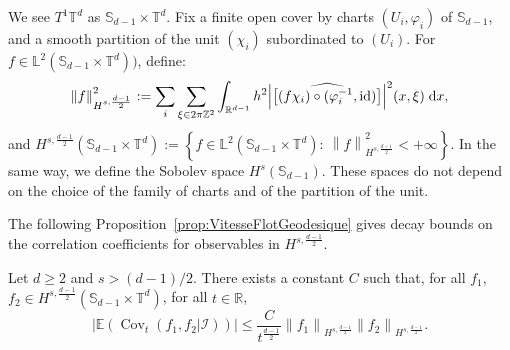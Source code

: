 \documentclass[AHL,Unicode,longabstracts]{cedram}
\DeclareMathOperator{\id}{id}
\DeclareMathOperator{\Cov}{Cov}
\newcommand{\Z}{\mathbb{Z}}
\newcommand{\R}{\mathbb{R}}
\newcommand{\Ebb}{\mathbb{E}}
\newcommand{\Lbb}{\mathbb{L}}
\newcommand{\Sbb}{\mathbb{S}}
\newcommand{\Tbb}{\mathbb{T}}
\newcommand{\Ical}{\mathcal{I}}
\newcommand{\dd}{\;{\rm d}}
\newcommand{\norm}[2]{\left\| #1 \right\|_{#2}}
\renewcommand*{\hat}[1]{\mathchoice{\widehat{#1}}{\widehat{#1}}{\oldhat{#1}}{\oldhat{#1}}}\let\oldforall\forall
\renewcommand*{\forall}{\mathrel{\oldforall}}
\begin{document}
We see $T^1 \Tbb^d$ as $\Sbb_{d-1} \times \Tbb^d$. Fix a finite open cover by charts $(U_i, \varphi_i)$ of $\Sbb_{d-1}$, and a smooth partition of the unit $(\chi_i)$ subordinated to $(U_i)$. For $f\in \Lbb^2 (\Sbb_{d-1} \times \Tbb^d))$, define:
\[
\norm{f}{H^{s,\frac{d-1}{2}}}^2 := \sum_i \sum_{\xi \in 2\pi\Z^2} \int_{\R^{d-1}} h^2 \Big|\hat{\big[(f \chi_i)\circ(\varphi_i^{-1},\id)\big]}\Big|^2 (x,\xi) \dd x,
\]
and $H^{s,\frac{d-1}{2}} (\Sbb_{d-1} \times \Tbb^d) := \left\{ f \in \Lbb^2 (\Sbb_{d-1} \times \Tbb^d): \ \norm{f}{H^{s,\frac{d-1}{2}}}^2 <+\infty \right\}$. In the same way, we define the Sobolev space $H^s (\Sbb_{d-1})$. These spaces do not depend on the choice of the family of charts and of the partition of the unit.


The following Proposition~\ref{prop:VitesseFlotGeodesique} gives decay bounds on the correlation coefficients for observables in $H^{s,\frac{d-1}{2}}$.



\begin{prop}\label{prop:VitesseFlotGeodesique}
Let $d \geq 2$ and $s > (d-1)/2$. There exists a constant $C$ such that, for all $f_1$, $f_2 \in H^{s,\frac{d-1}{2}} (\Sbb_{d-1} \times \Tbb^d)$, for all $t \in \R$,
\begin{equation}\label{eq:VitesseFlotGeodesique}
\big| \Ebb (\Cov_t (f_1, f_2|\Ical)) \big|
\leq \frac{C}{t^{\frac{d-1}{2}}} \norm{f_1}{H^{s,\frac{d-1}{2}}} \norm{f_2}{H^{s,\frac{d-1}{2}}}.
\end{equation}
\end{prop}
\end{document}
